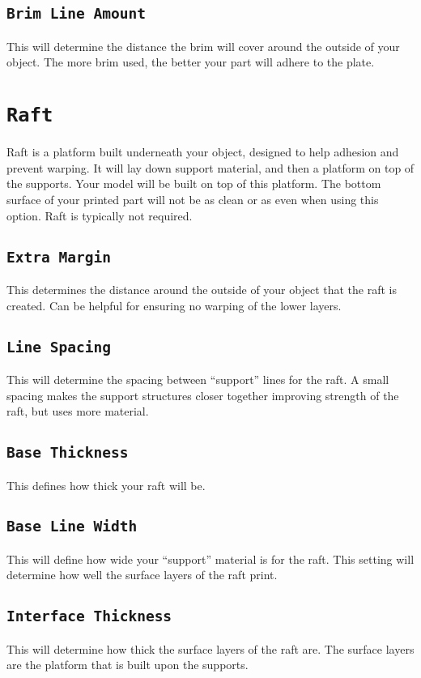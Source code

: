 \subsection{\texttt{Brim Line Amount}}
This will determine the distance the brim will cover around the outside of your object. The more brim used, the better your part will adhere to the plate. 

\section{\texttt{Raft}}
Raft is a platform built underneath your object, designed to help adhesion and prevent warping. It will lay down support material, and then a platform on top of the supports. Your model will be built on top of this platform. The bottom surface of your printed part will not be as clean or as even when using this option. Raft is typically not required.

\subsection{\texttt{Extra Margin}}
This determines the distance around the outside of your object that the raft is created. Can be helpful for ensuring no warping of the lower layers.

\subsection{\texttt{Line Spacing}}
This will determine the spacing between “support” lines for the raft. A small spacing makes the support structures closer together improving strength of the raft, but uses more material.

\subsection{\texttt{Base Thickness}}
This defines how thick your raft will be.

\subsection{\texttt{Base Line Width}}
This will define how wide your “support” material is for the raft. This setting will determine how well the surface layers of the raft print.

\subsection{\texttt{Interface Thickness}}
This will determine how thick the surface layers of the raft are. The surface layers are the platform that is built upon the supports.

